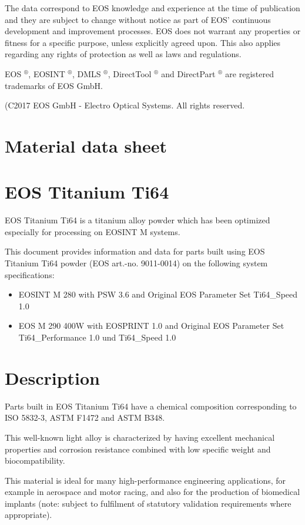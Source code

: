 \documentclass[10pt]{article}
\begin{document}
The data correspond to EOS knowledge and experience at the time of publication and they are subject to change without notice as part of EOS' continuous development and improvement processes. EOS does not warrant any properties or fitness for a specific purpose, unless explicitly agreed upon. This also applies regarding any rights of protection as well as laws and regulations.

EOS $^{\circledR}$, EOSINT $^{\circledR}$, DMLS $^{\circledR}$, DirectTool $^{\circledR}$ and DirectPart ${ }^{\circledR}$ are registered trademarks of EOS GmbH.

(C2017 EOS GmbH - Electro Optical Systems. All rights reserved.

\section*{Material data sheet}
\section*{EOS Titanium Ti64}
EOS Titanium Ti64 is a titanium alloy powder which has been optimized especially for processing on EOSINT M systems.

This document provides information and data for parts built using EOS Titanium Ti64 powder (EOS art.-no. 9011-0014) on the following system specifications:

\begin{itemize}
  \item EOSINT M 280 with PSW 3.6 and Original EOS Parameter Set Ti64\_Speed 1.0
  \item EOS M 290 400W with EOSPRINT 1.0 and Original EOS Parameter Set Ti64\_Performance 1.0 und Ti64\_Speed 1.0
\end{itemize}

\section*{Description}
Parts built in EOS Titanium Ti64 have a chemical composition corresponding to ISO 5832-3, ASTM F1472 and ASTM B348.

This well-known light alloy is characterized by having excellent mechanical properties and corrosion resistance combined with low specific weight and biocompatibility.

This material is ideal for many high-performance engineering applications, for example in aerospace and motor racing, and also for the production of biomedical implants (note: subject to fulfilment of statutory validation requirements where appropriate).
\end{document}
